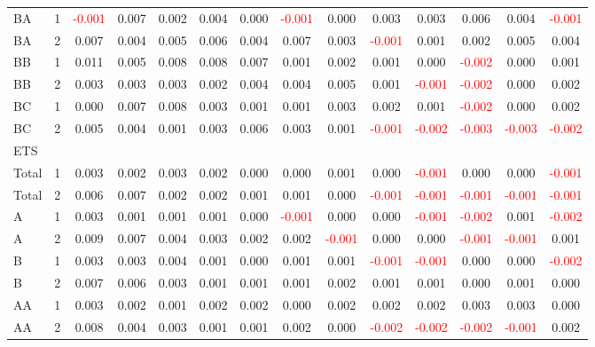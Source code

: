 \begin{table}[H]
{\begin{tabular}{llcccccccccccc}
BA & 1 & \textcolor{red}{-0.001} & 0.007 & 0.002 & 0.004 & 0.000 & \textcolor{red}{-0.001} & 0.000 & 0.003 & 0.003 & 0.006 & 0.004 & \textcolor{red}{-0.001}\\
BA & 2 & 0.007 & 0.004 & 0.005 & 0.006 & 0.004 & 0.007 & 0.003 & \textcolor{red}{-0.001} & 0.001 & 0.002 & 0.005 & 0.004\\
BB & 1 & 0.011 & 0.005 & 0.008 & 0.008 & 0.007 & 0.001 & 0.002 & 0.001 & 0.000 & \textcolor{red}{-0.002} & 0.000 & 0.001\\
BB & 2 & 0.003 & 0.003 & 0.003 & 0.002 & 0.004 & 0.004 & 0.005 & 0.001 & \textcolor{red}{-0.001} & \textcolor{red}{-0.002} & 0.000 & 0.002\\
BC & 1 & 0.000 & 0.007 & 0.008 & 0.003 & 0.001 & 0.001 & 0.003 & 0.002 & 0.001 & \textcolor{red}{-0.002} & 0.000 & 0.002\\
BC & 2 & 0.005 & 0.004 & 0.001 & 0.003 & 0.006 & 0.003 & 0.001 & \textcolor{red}{-0.001} & \textcolor{red}{-0.002} & \textcolor{red}{-0.003} & \textcolor{red}{-0.003} & \textcolor{red}{-0.002}\\
\hline
ETS &  &  &  &  &  &  &  &  &  &  &  &  & \\
\hline
Total & 1 & 0.003 & 0.002 & 0.003 & 0.002 & 0.000 & 0.000 & 0.001 & 0.000 & \textcolor{red}{-0.001} & 0.000 & 0.000 & \textcolor{red}{-0.001}\\
Total & 2 & 0.006 & 0.007 & 0.002 & 0.002 & 0.001 & 0.001 & 0.000 & \textcolor{red}{-0.001} & \textcolor{red}{-0.001} & \textcolor{red}{-0.001} & \textcolor{red}{-0.001} & \textcolor{red}{-0.001}\\
A & 1 & 0.003 & 0.001 & 0.001 & 0.001 & 0.000 & \textcolor{red}{-0.001} & 0.000 & 0.000 & \textcolor{red}{-0.001} & \textcolor{red}{-0.002} & 0.001 & \textcolor{red}{-0.002}\\
A & 2 & 0.009 & 0.007 & 0.004 & 0.003 & 0.002 & 0.002 & \textcolor{red}{-0.001} & 0.000 & 0.000 & \textcolor{red}{-0.001} & \textcolor{red}{-0.001} & 0.001\\
B & 1 & 0.003 & 0.003 & 0.004 & 0.001 & 0.000 & 0.001 & 0.001 & \textcolor{red}{-0.001} & \textcolor{red}{-0.001} & 0.000 & 0.000 & \textcolor{red}{-0.002}\\
B & 2 & 0.007 & 0.006 & 0.003 & 0.001 & 0.001 & 0.001 & 0.002 & 0.001 & 0.001 & 0.000 & 0.001 & 0.000\\
AA & 1 & 0.003 & 0.002 & 0.001 & 0.002 & 0.002 & 0.000 & 0.002 & 0.002 & 0.002 & 0.003 & 0.003 & 0.000\\
AA & 2 & 0.008 & 0.004 & 0.003 & 0.001 & 0.001 & 0.002 & 0.000 & \textcolor{red}{-0.002} & \textcolor{red}{-0.002} & \textcolor{red}{-0.002} & \textcolor{red}{-0.001} & 0.002\\

\end{tabular}}
\end{table}
